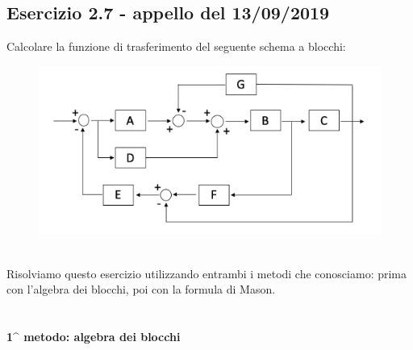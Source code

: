 \documentclass[12pt,a4paper]{article}
\begin{document}
	\subsection*{Esercizio 2.7 - appello del 13/09/2019} Calcolare la funzione di trasferimento del seguente schema a blocchi:
	\begin{figure}[h!]
		\centering
		\includegraphics[scale=0.5]{./images/schema27.png}
	\end{figure}
	\\ Risolviamo questo esercizio utilizzando entrambi i metodi che conosciamo: prima con l'algebra dei blocchi, poi con la formula di Mason.\\ \\ \\
	\textbf{1^ metodo: algebra dei blocchi}
\end{document}
